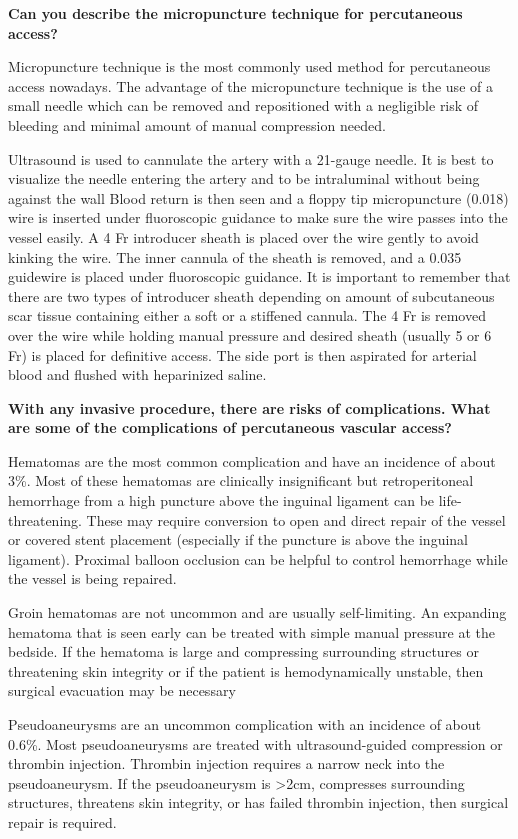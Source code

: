 \documentclass[
]{book}
\begin{document}
\textbf{Can you describe the micropuncture technique for percutaneous
access?}

Micropuncture technique is the most commonly used method for
percutaneous access nowadays. The advantage of the micropuncture
technique is the use of a small needle which can be removed and
repositioned with a negligible risk of bleeding and minimal amount of
manual compression needed.

Ultrasound is used to cannulate the artery with a 21-gauge needle. It is
best to visualize the needle entering the artery and to be intraluminal
without being against the wall Blood return is then seen and a floppy
tip micropuncture (0.018) wire is inserted under fluoroscopic guidance
to make sure the wire passes into the vessel easily. A 4 Fr introducer
sheath is placed over the wire gently to avoid kinking the wire. The
inner cannula of the sheath is removed, and a 0.035 guidewire is placed
under fluoroscopic guidance. It is important to remember that there are
two types of introducer sheath depending on amount of subcutaneous scar
tissue containing either a soft or a stiffened cannula. The 4 Fr is
removed over the wire while holding manual pressure and desired sheath
(usually 5 or 6 Fr) is placed for definitive access. The side port is
then aspirated for arterial blood and flushed with heparinized saline.

\textbf{With any invasive procedure, there are risks of complications. What
are some of the complications of percutaneous vascular access?}

Hematomas are the most common complication and have an incidence of
about 3\%. Most of these hematomas are clinically insignificant but
retroperitoneal hemorrhage from a high puncture above the inguinal
ligament can be life-threatening. These may require conversion to open
and direct repair of the vessel or covered stent placement (especially
if the puncture is above the inguinal ligament). Proximal balloon
occlusion can be helpful to control hemorrhage while the vessel is being
repaired.

Groin hematomas are not uncommon and are usually self-limiting. An
expanding hematoma that is seen early can be treated with simple manual
pressure at the bedside. If the hematoma is large and compressing
surrounding structures or threatening skin integrity or if the patient
is hemodynamically unstable, then surgical evacuation may be necessary

Pseudoaneurysms are an uncommon complication with an incidence of about
0.6\%. Most pseudoaneurysms are treated with ultrasound-guided
compression or thrombin injection. Thrombin injection requires a narrow
neck into the pseudoaneurysm. If the pseudoaneurysm is \textgreater2cm, compresses
surrounding structures, threatens skin integrity, or has failed thrombin
injection, then surgical repair is required.
\end{document}
